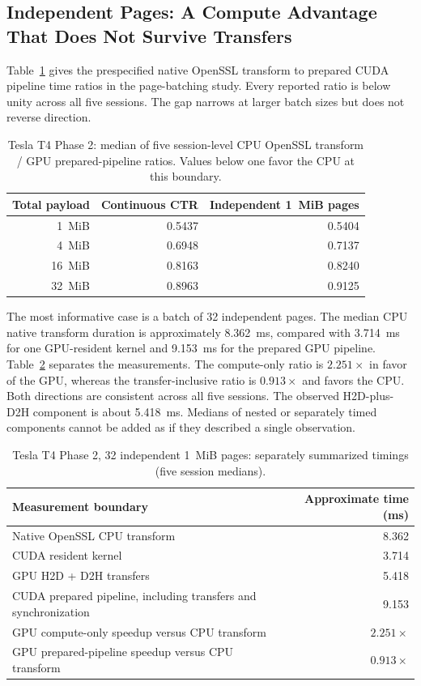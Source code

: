 \subsection{Independent Pages: A Compute Advantage That Does Not Survive Transfers}
\label{sec:page-results}
Table~\ref{tab:page-primary} gives the prespecified native OpenSSL transform
to prepared CUDA pipeline time ratios in the page-batching study. Every
reported ratio is below unity across all five sessions. The gap narrows at
larger batch sizes but does not reverse direction.

\begin{table}[htbp]
\centering\small
\caption{Tesla T4 Phase 2: median of five session-level CPU OpenSSL transform / GPU prepared-pipeline ratios. Values below one favor the CPU at this boundary.}
\label{tab:page-primary}
\begin{tabular}{@{}rrr@{}}\toprule
Total payload & Continuous CTR & Independent 1~MiB pages\\\midrule
1~MiB & 0.5437 & 0.5404\\
4~MiB & 0.6948 & 0.7137\\
16~MiB & 0.8163 & 0.8240\\
32~MiB & 0.8963 & 0.9125\\\bottomrule
\end{tabular}
\end{table}

The most informative case is a batch of 32 independent pages. The median CPU
native transform duration is approximately 8.362~ms, compared with 3.714~ms
for one GPU-resident kernel and 9.153~ms for the prepared GPU pipeline.
Table~\ref{tab:page-32-components} separates the measurements. The
compute-only ratio is $2.251\times$ in favor of the GPU, whereas the
transfer-inclusive ratio is $0.913\times$ and favors the CPU. Both directions
are consistent across all five sessions. The observed H2D-plus-D2H component
is about 5.418~ms. Medians of nested or separately timed components cannot
be added as if they described a single observation.

\begin{table}[htbp]
\centering\small
\caption{Tesla T4 Phase 2, 32 independent 1~MiB pages: separately summarized timings (five session medians).}
\label{tab:page-32-components}
\begin{tabularx}{\linewidth}{@{}Xr@{}}\toprule
Measurement boundary & Approximate time (ms)\\\midrule
Native OpenSSL CPU transform & 8.362\\
CUDA resident kernel & 3.714\\
GPU H2D + D2H transfers & 5.418\\
CUDA prepared pipeline, including transfers and synchronization & 9.153\\\midrule
GPU compute-only speedup versus CPU transform & $2.251\times$\\
GPU prepared-pipeline speedup versus CPU transform & $0.913\times$\\\bottomrule
\end{tabularx}
\end{table}

